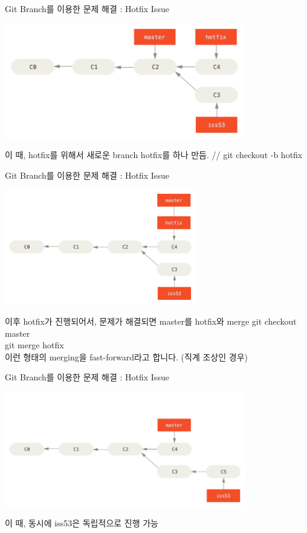 \documentclass{beamer}
\begin{document}
\begin{frame}{Git Branch를 이용한 문제 해결 : Hotfix Issue} 

\begin{center}
\includegraphics[height=5cm,keepaspectratio]{basic-branching-4}  \\
\end{center}
이 때, hotfix를 위해서 새로운 branch hotfix를 하나 만듬. //
git checkout -b hotfix
\end{frame}



\begin{frame}{Git Branch를 이용한 문제 해결 : Hotfix Issue} 

\begin{center}
\includegraphics[height=5cm,keepaspectratio]{basic-branching-5}  \\
\end{center}
이후 hotfix가 진행되어서, 문제가 해결되면 master를 hotfix와 merge    
git checkout master\\ 
git merge hotfix \\

이런 형태의 merging을 fast-forward라고 합니다. (직계 조상인 경우)
\end{frame}

\begin{frame}{Git Branch를 이용한 문제 해결 : Hotfix Issue} 

\begin{center}
\includegraphics[height=5cm,keepaspectratio]{basic-branching-6} \\
\end{center}
이 때, 동시에 iss53은 독립적으로 진행 가능
\end{frame}
\end{document}
